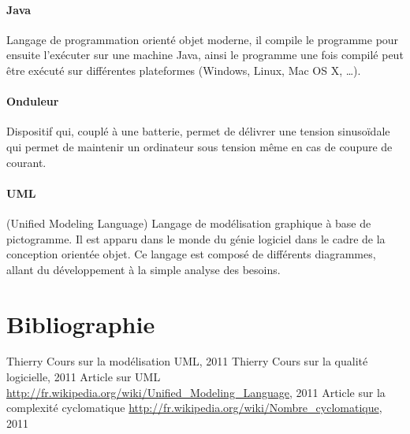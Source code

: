 \documentclass[12pt,a4paper,openany]{article}
\begin{document}
	\paragraph{Java} Langage de programmation orienté objet moderne, il compile le programme pour ensuite l'exécuter sur une machine Java, ainsi le programme une fois
	compilé peut être exécuté sur différentes plateformes (Windows, Linux, Mac OS X, \ldots).
	\paragraph{Onduleur} Dispositif qui, couplé à une batterie, permet de délivrer une tension sinusoïdale qui permet de maintenir un ordinateur sous tension même
	en cas de coupure de courant.
	\paragraph{UML} (Unified Modeling Language) Langage de modélisation graphique à base de pictogramme. Il est apparu dans le monde du génie logiciel dans le cadre de la conception orientée objet. Ce langage est composé de différents diagrammes, allant du développement à la simple analyse des besoins. 
\section{Bibliographie}
\begin{thebibliography}{1}
	 Thierry  Cours sur la modélisation UML, 2011 
	 Thierry  Cours sur la qualité logicielle, 2011 
	 Article sur UML \url{http://fr.wikipedia.org/wiki/Unified_Modeling_Language}, 2011 
	 Article sur la complexité cyclomatique \newline \url{http://fr.wikipedia.org/wiki/Nombre_cyclomatique}, 2011 

\end{thebibliography}
\end{document}
